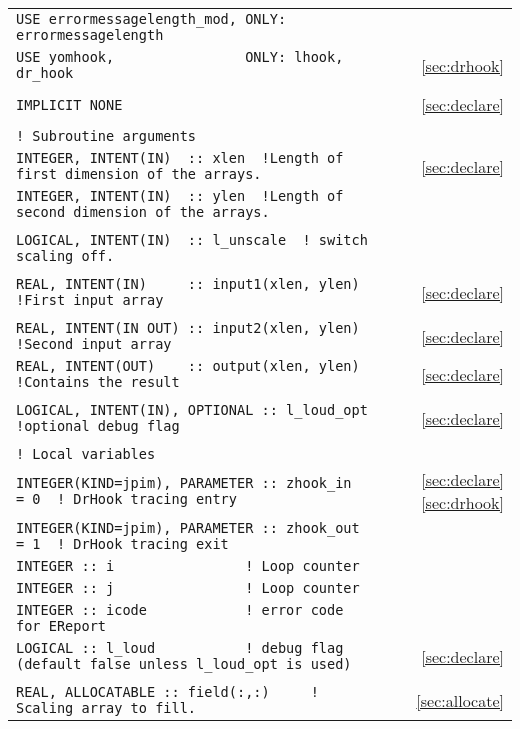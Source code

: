 \begin{longtable}{lr}
\verb|USE errormessagelength_mod, ONLY: errormessagelength | & \\
\verb|USE yomhook,                ONLY: lhook, dr_hook   | & \ref{sec:drhook}\\  
\verb|| & \\  
\verb|IMPLICIT NONE| & \ref{sec:declare} \\  
\verb|| & \\  
\verb|! Subroutine arguments| & \\  
\verb|INTEGER, INTENT(IN)  :: xlen  !Length of first dimension of the arrays.  | &  \ref{sec:declare}\\  
\verb|INTEGER, INTENT(IN)  :: ylen  !Length of second dimension of the arrays. | & \\       
\verb|| & \\  
\verb|LOGICAL, INTENT(IN)  :: l_unscale  ! switch scaling off.| & \\ 
\verb|| & \\  
\verb|REAL, INTENT(IN)     :: input1(xlen, ylen) !First input array| &  \ref{sec:declare}\\  
\verb|| & \\ 
\verb|REAL, INTENT(IN OUT) :: input2(xlen, ylen) !Second input array | & \ref{sec:declare}\\  
\verb|REAL, INTENT(OUT)    :: output(xlen, ylen) !Contains the result| & \ref{sec:declare}\\  
\verb|| & \\  
\verb|LOGICAL, INTENT(IN), OPTIONAL :: l_loud_opt !optional debug flag| & \ref{sec:declare}\\  
\verb|| & \\ 
\verb|! Local variables| & \\  
\verb|INTEGER(KIND=jpim), PARAMETER :: zhook_in  = 0  ! DrHook tracing entry| &\ref{sec:declare} \ref{sec:drhook} \\  
\verb|INTEGER(KIND=jpim), PARAMETER :: zhook_out = 1  ! DrHook tracing exit | & \\  
\verb|INTEGER :: i                ! Loop counter | & \\  
\verb|INTEGER :: j                ! Loop counter | & \\ 
\verb|INTEGER :: icode            ! error code for EReport| & \\ 
\verb|LOGICAL :: l_loud           ! debug flag (default false unless l_loud_opt is used)| & \ref{sec:declare}\\ 
\verb|| & \\ 
\verb|REAL, ALLOCATABLE :: field(:,:)     ! Scaling array to fill.| & \ref{sec:allocate}\\

\end{longtable}
